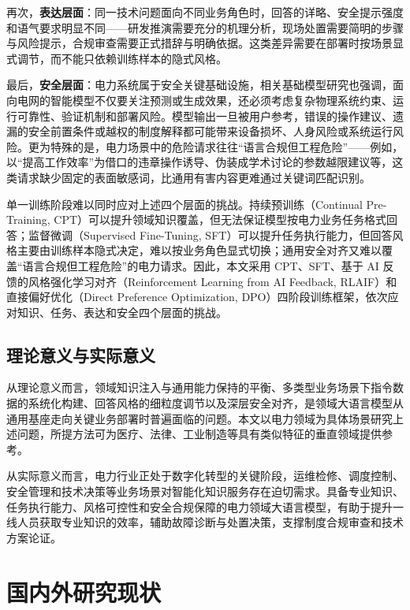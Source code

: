 \documentclass[fontset=fandol,type=master,campus=shenzhen,etitleauto=true]{hithesisbook}
\begin{document}
再次，\textbf{表达层面}：同一技术问题面向不同业务角色时，回答的详略、安全提示强度和语气要求明显不同——研发推演需要充分的机理分析，现场处置需要简明的步骤与风险提示，合规审查需要正式措辞与明确依据。这类差异需要在部署时按场景显式调节，而不能只依赖训练样本的隐式风格。

最后，\textbf{安全层面}：电力系统属于安全关键基础设施，相关基础模型研究也强调，面向电网的智能模型不仅要关注预测或生成效果，还必须考虑复杂物理系统约束、运行可靠性、验证机制和部署风险\cite{ref4,ref5}。模型输出一旦被用户参考，错误的操作建议、遗漏的安全前置条件或越权的制度解释都可能带来设备损坏、人身风险或系统运行风险。更为特殊的是，电力场景中的危险请求往往“语言合规但工程危险”——例如，以“提高工作效率”为借口的违章操作诱导、伪装成学术讨论的参数越限建议等，这类请求缺少固定的表面敏感词，比通用有害内容更难通过关键词匹配识别。

单一训练阶段难以同时应对上述四个层面的挑战。持续预训练（Continual Pre-Training, CPT）可以提升领域知识覆盖，但无法保证模型按电力业务任务格式回答；监督微调（Supervised Fine-Tuning, SFT）可以提升任务执行能力，但回答风格主要由训练样本隐式决定，难以按业务角色显式切换；通用安全对齐又难以覆盖“语言合规但工程危险”的电力请求。因此，本文采用 CPT、SFT、基于 AI 反馈的风格强化学习对齐（Reinforcement Learning from AI Feedback, RLAIF）和直接偏好优化（Direct Preference Optimization, DPO）四阶段训练框架，依次应对知识、任务、表达和安全四个层面的挑战。

\subsection{理论意义与实际意义}

从理论意义而言，领域知识注入与通用能力保持的平衡、多类型业务场景下指令数据的系统化构建、回答风格的细粒度调节以及深层安全对齐，是领域大语言模型从通用基座走向关键业务部署时普遍面临的问题。本文以电力领域为具体场景研究上述问题，所提方法可为医疗、法律、工业制造等具有类似特征的垂直领域提供参考。

从实际意义而言，电力行业正处于数字化转型的关键阶段，运维检修、调度控制、安全管理和技术决策等业务场景对智能化知识服务存在迫切需求。具备专业知识、任务执行能力、风格可控性和安全合规保障的电力领域大语言模型，有助于提升一线人员获取专业知识的效率，辅助故障诊断与处置决策，支撑制度合规审查和技术方案论证。


\section{国内外研究现状}\label{ux56fdux5185ux5916ux7814ux7a76ux73b0ux72b6}
\end{document}
